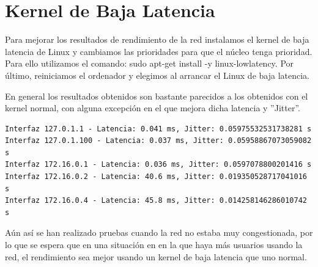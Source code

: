 \section{Kernel de Baja Latencia}

Para mejorar los resultados de rendimiento de la red instalamos el kernel de baja latencia de Linux y cambiamos las prioridades para que el núcleo tenga prioridad. Para ello utilizamos el comando:
sudo apt-get install -y linux-lowlatency.
Por último, reiniciamos el ordenador y elegimos al arrancar el Linux de baja latencia.

En general los resultados obtenidos son bastante parecidos a los obtenidos con el kernel normal, con alguna excepción en el que mejora dicha latencia y ''Jitter''. 

\begin{lstlisting}[caption={Salida del fichero python que calcula retardos entre interfaces con kernel de baja latencia.}]
Interfaz 127.0.1.1 - Latencia: 0.041 ms, Jitter: 0.05975532531738281 s
Interfaz 127.0.1.100 - Latencia: 0.037 ms, Jitter: 0.05958867073059082 s
Interfaz 172.16.0.1 - Latencia: 0.036 ms, Jitter: 0.0597078800201416 s
Interfaz 172.16.0.2 - Latencia: 40.6 ms, Jitter: 0.019350528717041016 s
Interfaz 172.16.0.4 - Latencia: 45.8 ms, Jitter: 0.014258146286010742 s
\end{lstlisting}

Aún así se han realizado pruebas cuando la red no estaba muy congestionada, por lo que se espera que en una situación en en la que haya más usuarios usando la red, el rendimiento sea mejor usando un kernel de baja latencia que uno normal. 

